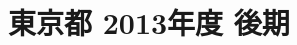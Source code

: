 \documentclass[../../hsm_tok_q.tex]{subfiles}
\begin{document}
    \section{東京都 2013年度 後期}
    \subsection{　}
    
    \newpage
    \subsection{　}
    
    \newpage
    \subsection{　}
    
    \newpage
    \subsection{　}
    
    \newpage
    \subsection{　}
    
\end{document}
